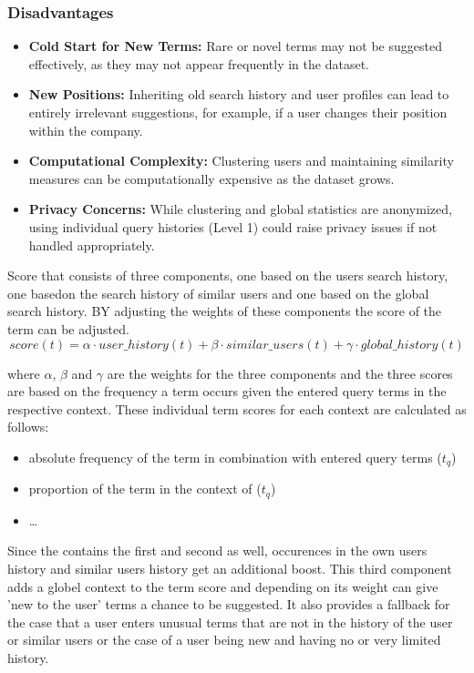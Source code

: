 \subsubsection*{Disadvantages}
\begin{itemize}
    \item \textbf{Cold Start for New Terms:} Rare or novel terms may not be suggested effectively, as they may not appear frequently in the dataset.
    \item \textbf{New Positions:} Inheriting old search history and user profiles can lead to entirely irrelevant suggestions, for example, if a user changes their position within the company.
    \item \textbf{Computational Complexity:} Clustering users and maintaining similarity measures can be computationally expensive as the dataset grows.
    \item \textbf{Privacy Concerns:} While clustering and global statistics are anonymized, using individual query histories (Level 1) could raise privacy issues if not handled appropriately.
\end{itemize}




Score that consists of three components, one based on the users search history, one basedon the search history of similar users and one based on the global search history. BY adjusting the weights of these components the score of the term can be adjusted.
$$score(t) = \alpha \cdot user\_history(t) + \beta \cdot similar\_users(t) + \gamma \cdot global\_history(t)$$

where $\alpha$, $\beta$ and $\gamma$ are the weights for the three components and the three scores are based on the frequency a term occurs given the entered query terms in the respective context.
These individual term scores for each context are calculated as follows:

\begin{itemize}
    \item absolute frequency of the term in combination with entered query terms ($t_q$)
    \item proportion of the term in the context of ($t_q$)
    \item \dots
\end{itemize}

Since the contains the first and second as well, occurences in the own users history and similar users history get an additional boost. %
This third component adds a globel context to the term score and depending on its weight can give 'new to the user' terms a chance to be suggested.
It also provides a fallback for the case that a user enters unusual terms that are not in the history of the user or similar users or the case of a user being new and having no or very limited history.



